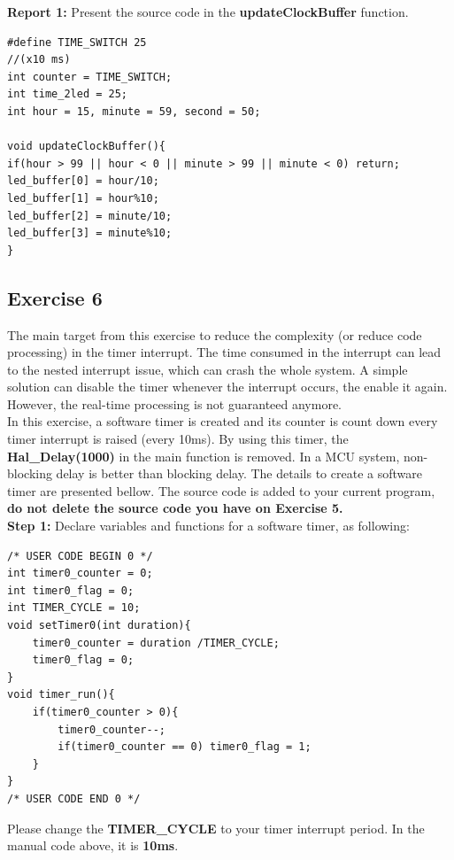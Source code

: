 \documentclass[twoside, final]{hcmut_report}
\begin{document}
\textbf{Report 1: } Present the source code in the \textbf{updateClockBuffer} function.

\begin{lstlisting}[caption=The update7SEG function]
#define TIME_SWITCH 25
//(x10 ms)
int counter = TIME_SWITCH;
int time_2led = 25;
int hour = 15, minute = 59, second = 50;

void updateClockBuffer(){
if(hour > 99 || hour < 0 || minute > 99 || minute < 0) return;
led_buffer[0] = hour/10;
led_buffer[1] = hour%10;
led_buffer[2] = minute/10;
led_buffer[3] = minute%10;
}
\end{lstlisting}

\subsection{Exercise 6}
The main target from this exercise to reduce the complexity (or reduce code processing) in the timer interrupt. The time consumed in the interrupt can lead to the nested interrupt issue, which can crash the whole system. A simple solution can disable the timer whenever the interrupt occurs, the enable it again. However, the real-time processing is not guaranteed anymore.\\

In this exercise, a software timer is created and its counter is count down every timer interrupt is raised (every 10ms). By using this timer, the \textbf{Hal\_Delay(1000)} in the main function is removed. In a MCU system, non-blocking delay is better than blocking delay. The details to create a software timer are presented bellow. The source code is added to your current program, \textbf{do not delete the source code you have on Exercise 5.}\\

\textbf{Step 1: } Declare variables and functions for a software timer, as following:
\begin{lstlisting}[caption=Software timer based timer interrupt]
/* USER CODE BEGIN 0 */
int timer0_counter = 0;
int timer0_flag = 0;
int TIMER_CYCLE = 10;
void setTimer0(int duration){
	timer0_counter = duration /TIMER_CYCLE;
	timer0_flag = 0;
}
void timer_run(){
	if(timer0_counter > 0){
		timer0_counter--;
		if(timer0_counter == 0) timer0_flag = 1;
	}
}
/* USER CODE END 0 */
\end{lstlisting}

Please change the \textbf{TIMER\_CYCLE} to your timer interrupt period. In the manual code above, it is \textbf{10ms}. \\
\end{document}
